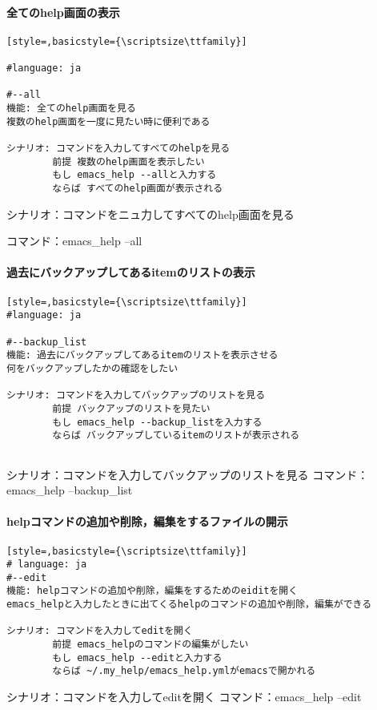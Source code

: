 \paragraph{全てのhelp画面の表示}\begin{lstlisting}[style=,basicstyle={\scriptsize\ttfamily}]

#language: ja

#--all
機能: 全てのhelp画面を見る
複数のhelp画面を一度に見たい時に便利である

シナリオ: コマンドを入力してすべてのhelpを見る
        前提 複数のhelp画面を表示したい
        もし emacs_help --allと入力する
        ならば すべてのhelp画面が表示される
\end{lstlisting}
シナリオ：コマンドをニュ力してすべてのhelp画面を見る

コマンド：emacs\_help --all

\paragraph{過去にバックアップしてあるitemのリストの表示}\begin{lstlisting}[style=,basicstyle={\scriptsize\ttfamily}]
#language: ja

#--backup_list
機能: 過去にバックアップしてあるitemのリストを表示させる
何をバックアップしたかの確認をしたい

シナリオ: コマンドを入力してバックアップのリストを見る
        前提 バックアップのリストを見たい
        もし emacs_help --backup_listを入力する
        ならば バックアップしているitemのリストが表示される
        
\end{lstlisting}
シナリオ：コマンドを入力してバックアップのリストを見る
コマンド：emacs\_help --backup\_list

\paragraph{helpコマンドの追加や削除，編集をするファイルの開示}\begin{lstlisting}[style=,basicstyle={\scriptsize\ttfamily}]
# language: ja
#--edit
機能: helpコマンドの追加や削除，編集をするためのeiditを開く
emacs_helpと入力したときに出てくるhelpのコマンドの追加や削除，編集ができる

シナリオ: コマンドを入力してeditを開く
        前提 emacs_helpのコマンドの編集がしたい
        もし emacs_help --editと入力する
        ならば ~/.my_help/emacs_help.ymlがemacsで開かれる
\end{lstlisting}
シナリオ：コマンドを入力してeditを開く
コマンド：emacs\_help --edit

